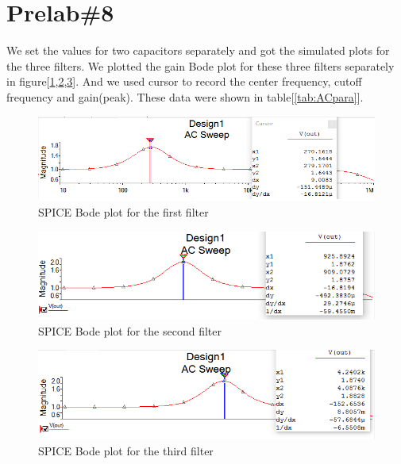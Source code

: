 \documentclass{IEEEtran}
\begin{document}
	\section{\textbf{Prelab\#8}}
	We set the values for two capacitors separately and got the simulated plots for the three filters. We plotted the gain Bode plot for these three filters separately in figure[\ref{fig:8.1},\ref{fig:8.2},\ref{fig:8.3}]. And we used cursor to record the center frequency, cutoff frequency and gain(peak). These data were shown in table[\ref{tab:ACpara}].
	\begin{figure}[!htbp]
		\centering
		\begin{framed}
			\includegraphics[width=\linewidth]{images/8_1.PNG}
			\caption{SPICE Bode plot for the first filter}
			\label{fig:8.1}
		\end{framed}
	\end{figure}
	\begin{figure}[!htbp]
		\centering
		\begin{framed}
			\includegraphics[width=\linewidth]{images/8_2.PNG}
			\caption{SPICE Bode plot for the second filter}
			\label{fig:8.2}
		\end{framed}
	\end{figure}
	\begin{figure}[!htbp]
		\centering
		\begin{framed}
			\includegraphics[width=\linewidth]{images/8_3.PNG}
			\caption{SPICE Bode plot for the third filter}
			\label{fig:8.3}
		\end{framed}
	\end{figure}
\end{document}
